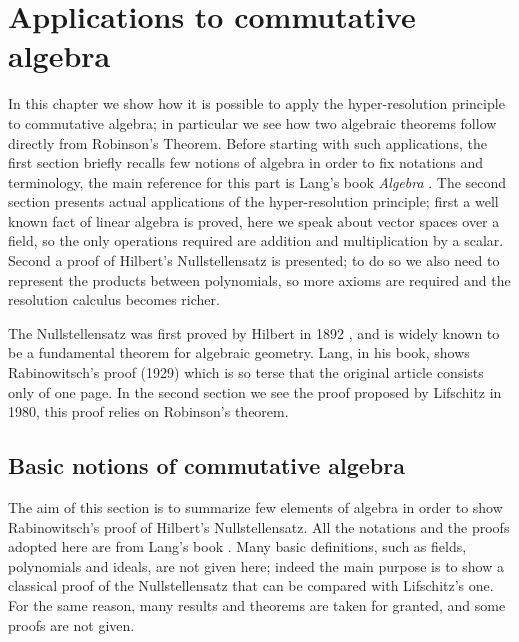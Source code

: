 \documentclass[a4paper,12pt,oneside]{book}
\begin{document}
\chapter{Applications to commutative algebra} %
In this chapter we show how it is possible to apply the hyper-resolution principle to commutative algebra; in particular we see how two algebraic theorems follow directly from Robinson's Theorem. Before starting with such applications, the first section briefly recalls few notions of algebra in order to fix notations and terminology, the main reference for this part is Lang's book \textit{Algebra} \cite{Lang}.
The second section presents actual applications of the hyper-resolution principle; first a  well known fact of linear algebra is proved, here we speak about vector spaces over a field, so the only operations required are addition and multiplication by a scalar. 
Second a proof of Hilbert's Nullstellensatz is presented; to do so we also need to represent the products between polynomials, so more axioms are required and the resolution calculus becomes richer.

The Nullstellensatz was first proved by Hilbert \cite{Hilbert} in 1892 , and is widely known to be a fundamental theorem for algebraic geometry. Lang, in his book,  shows Rabinowitsch's proof (1929) which is so terse that the original article \cite{Rabin} consists only of one page. 
In the second section we see the proof proposed by Lifschitz \cite{lifschitz} in 1980, this proof relies on Robinson's theorem.%



\section{Basic notions of commutative algebra}
The aim of this section is to summarize few elements of algebra in order to show  Rabinowitsch's proof of  Hilbert's Nullstellensatz. All the notations and the proofs adopted here are from Lang's book \cite{Lang}. Many basic definitions, such as fields, polynomials and ideals, are not given here; indeed the main purpose is to show a classical proof of the Nullstellensatz that can be compared with Lifschitz's one.
For the same reason, many results and theorems are taken for granted, and some proofs are not given.
\end{document}
